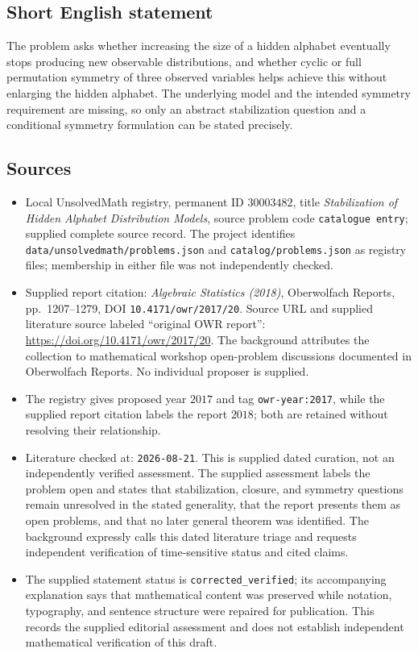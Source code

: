 \documentclass[11pt]{article}
\begin{document}
\subsection{Short English statement}
The problem asks whether increasing the size of a hidden alphabet eventually stops producing new observable distributions, and whether cyclic or full permutation symmetry of three observed variables helps achieve this without enlarging the hidden alphabet. The underlying model and the intended symmetry requirement are missing, so only an abstract stabilization question and a conditional symmetry formulation can be stated precisely.
\subsection{Sources}
\begin{itemize}
\item Local UnsolvedMath registry, permanent ID \(30003482\), title \emph{Stabilization of Hidden Alphabet Distribution Models}, source problem code \texttt{catalogue entry}; supplied complete source record. The project identifies \texttt{data/unsolvedmath/problems.json} and \texttt{catalog/problems.json} as registry files; membership in either file was not independently checked.
\item Supplied report citation: \emph{Algebraic Statistics (2018)}, Oberwolfach Reports, pp.~1207--1279, DOI \texttt{10.4171/owr/2017/20}. Source URL and supplied literature source labeled ``original OWR report'': \url{https://doi.org/10.4171/owr/2017/20}. The background attributes the collection to mathematical workshop open-problem discussions documented in Oberwolfach Reports. No individual proposer is supplied.
\item The registry gives proposed year \(2017\) and tag \texttt{owr-year:2017}, while the supplied report citation labels the report \(2018\); both are retained without resolving their relationship.
\item Literature checked at: \texttt{2026-08-21}. This is supplied dated curation, not an independently verified assessment. The supplied assessment labels the problem open and states that stabilization, closure, and symmetry questions remain unresolved in the stated generality, that the report presents them as open problems, and that no later general theorem was identified. The background expressly calls this dated literature triage and requests independent verification of time-sensitive status and cited claims.
\item The supplied statement status is \texttt{corrected\_verified}; its accompanying explanation says that mathematical content was preserved while notation, typography, and sentence structure were repaired for publication. This records the supplied editorial assessment and does not establish independent mathematical verification of this draft.
\end{itemize}
\end{document}
